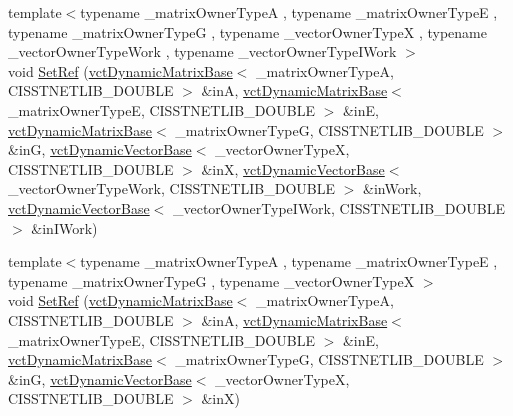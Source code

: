 \begin{DoxyCompactItemize}
\item 
{\footnotesize template$<$typename \-\_\-matrix\-Owner\-Type\-A , typename \-\_\-matrix\-Owner\-Type\-E , typename \-\_\-matrix\-Owner\-Type\-G , typename \-\_\-vector\-Owner\-Type\-X , typename \-\_\-vector\-Owner\-Type\-Work , typename \-\_\-vector\-Owner\-Type\-I\-Work $>$ }\\void \hyperlink{classnmr_l_sq_lin_solution_dynamic_ab01c1ed5c95daa2535419fb7731017ee}{Set\-Ref} (\hyperlink{classvct_dynamic_matrix_base}{vct\-Dynamic\-Matrix\-Base}$<$ \-\_\-matrix\-Owner\-Type\-A, C\-I\-S\-S\-T\-N\-E\-T\-L\-I\-B\-\_\-\-D\-O\-U\-B\-L\-E $>$ \&in\-A, \hyperlink{classvct_dynamic_matrix_base}{vct\-Dynamic\-Matrix\-Base}$<$ \-\_\-matrix\-Owner\-Type\-E, C\-I\-S\-S\-T\-N\-E\-T\-L\-I\-B\-\_\-\-D\-O\-U\-B\-L\-E $>$ \&in\-E, \hyperlink{classvct_dynamic_matrix_base}{vct\-Dynamic\-Matrix\-Base}$<$ \-\_\-matrix\-Owner\-Type\-G, C\-I\-S\-S\-T\-N\-E\-T\-L\-I\-B\-\_\-\-D\-O\-U\-B\-L\-E $>$ \&in\-G, \hyperlink{classvct_dynamic_vector_base}{vct\-Dynamic\-Vector\-Base}$<$ \-\_\-vector\-Owner\-Type\-X, C\-I\-S\-S\-T\-N\-E\-T\-L\-I\-B\-\_\-\-D\-O\-U\-B\-L\-E $>$ \&in\-X, \hyperlink{classvct_dynamic_vector_base}{vct\-Dynamic\-Vector\-Base}$<$ \-\_\-vector\-Owner\-Type\-Work, C\-I\-S\-S\-T\-N\-E\-T\-L\-I\-B\-\_\-\-D\-O\-U\-B\-L\-E $>$ \&in\-Work, \hyperlink{classvct_dynamic_vector_base}{vct\-Dynamic\-Vector\-Base}$<$ \-\_\-vector\-Owner\-Type\-I\-Work, C\-I\-S\-S\-T\-N\-E\-T\-L\-I\-B\-\_\-\-D\-O\-U\-B\-L\-E $>$ \&in\-I\-Work)
\item 
{\footnotesize template$<$typename \-\_\-matrix\-Owner\-Type\-A , typename \-\_\-matrix\-Owner\-Type\-E , typename \-\_\-matrix\-Owner\-Type\-G , typename \-\_\-vector\-Owner\-Type\-X $>$ }\\void \hyperlink{classnmr_l_sq_lin_solution_dynamic_ad1fb6f082367bb63752c46a18e5af988}{Set\-Ref} (\hyperlink{classvct_dynamic_matrix_base}{vct\-Dynamic\-Matrix\-Base}$<$ \-\_\-matrix\-Owner\-Type\-A, C\-I\-S\-S\-T\-N\-E\-T\-L\-I\-B\-\_\-\-D\-O\-U\-B\-L\-E $>$ \&in\-A, \hyperlink{classvct_dynamic_matrix_base}{vct\-Dynamic\-Matrix\-Base}$<$ \-\_\-matrix\-Owner\-Type\-E, C\-I\-S\-S\-T\-N\-E\-T\-L\-I\-B\-\_\-\-D\-O\-U\-B\-L\-E $>$ \&in\-E, \hyperlink{classvct_dynamic_matrix_base}{vct\-Dynamic\-Matrix\-Base}$<$ \-\_\-matrix\-Owner\-Type\-G, C\-I\-S\-S\-T\-N\-E\-T\-L\-I\-B\-\_\-\-D\-O\-U\-B\-L\-E $>$ \&in\-G, \hyperlink{classvct_dynamic_vector_base}{vct\-Dynamic\-Vector\-Base}$<$ \-\_\-vector\-Owner\-Type\-X, C\-I\-S\-S\-T\-N\-E\-T\-L\-I\-B\-\_\-\-D\-O\-U\-B\-L\-E $>$ \&in\-X)
\item 

\end{DoxyCompactItemize}
